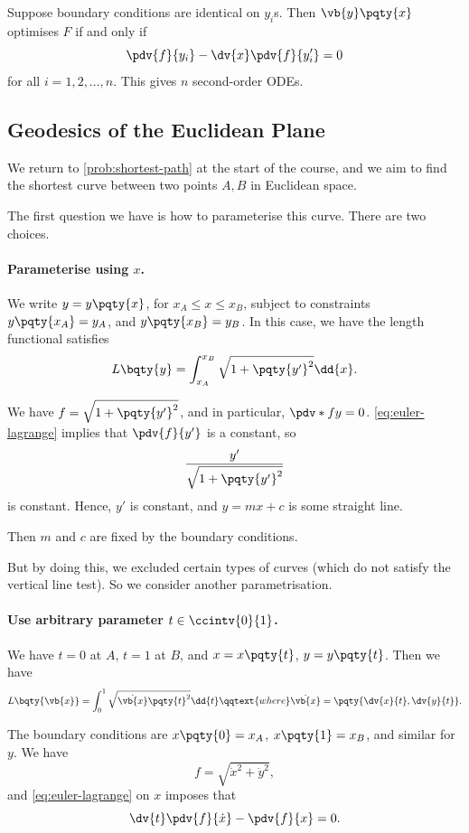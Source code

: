 Suppose boundary conditions are identical on \(y_i\)s. Then \(\vb{y} \pqty{x}\) optimises \(F\) if and only if
\[
    \pdv{f}{y_i} - \dv{x} \pdv{f}{y_i'} = 0
\]
for all \(i = 1, 2, \ldots, n\). This gives \(n\) second-order ODEs.

\subsection{Geodesics of the Euclidean Plane}

We return to \autoref{prob:shortest-path} at the start of the course, and we aim to find the shortest curve between two points \(A, B\) in Euclidean space.

The first question we have is how to parameterise this curve. There are two choices.

\paragraph{Parameterise using \(x\).} We write \(y = y\pqty{x}\), for \(x_A \leq x \leq x_B\), subject to constraints \(y\pqty{x_A} = y_A\), and \(y\pqty{x_B} = y_B\). In this case, we have the length functional satisfies
    \[
        L\bqty{y} = \int_{x_A}^{x_B} \sqrt{1 + \pqty{y'}^2} \dd{x}.
    \]

    We have \(f = \sqrt{1 + \pqty{y'}^2}\), and in particular, \(\pdv*{f}{y} = 0\). \eqref{eq:euler-lagrange} implies that \(\pdv{f}{y'}\) is a constant, so
    \[
        \frac{y'}{\sqrt{1 + \pqty{y'}^2}}
    \]
    is constant. Hence, \(y'\) is constant, and \(y = mx + c\) is some straight line.

    Then \(m\) and \(c\) are fixed by the boundary conditions.

But by doing this, we excluded certain types of curves (which do not satisfy the vertical line test). So we consider another parametrisation.

\paragraph{Use arbitrary parameter \(t \in \ccintv{0}{1}\).} We have \(t = 0\) at \(A\), \(t = 1\) at \(B\), and \(x = x\pqty{t}\), \(y = y\pqty{t}\). Then we have
\[
    L\bqty{\vb{x}} = \int_{0}^{1} \sqrt{\dot{\vb{x}}\pqty{t}^2} \dd{t} \qqtext{where} \dot{\vb{x}} = \pqty{\dv{x}{t}, \dv{y}{t}}.
\]

The boundary conditions are \(x\pqty{0} = x_A\), \(x\pqty{1} = x_B\), and similar for \(y\). We have
\[
    f = \sqrt{\dot{x}^2 + \dot{y}^2},
\]
and \eqref{eq:euler-lagrange} on \(x\) imposes that
\[
    \dv{t} \pdv{f}{\dot{x}} - \pdv{f}{x} = 0.
\]

